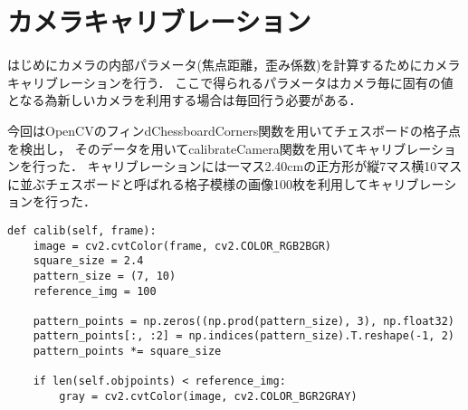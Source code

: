\section{カメラキャリブレーション}
\label{calib}

はじめにカメラの内部パラメータ(焦点距離，歪み係数)を計算するためにカメラキャリブレーションを行う．
ここで得られるパラメータはカメラ毎に固有の値となる為新しいカメラを利用する場合は毎回行う必要がある．

今回はOpenCVのフィンdChessboardCorners関数を用いてチェスボードの格子点を検出し，
そのデータを用いてcalibrateCamera関数を用いてキャリブレーションを行った．
キャリブレーションには一マス2.40cmの正方形が縦7マス横10マスに並ぶチェスボードと呼ばれる格子模様の画像100枚を利用してキャリブレーションを行った．

\begin{lstlisting}[caption=calibration code,label=calib_code]
def calib(self, frame):                                                                                                                                      
    image = cv2.cvtColor(frame, cv2.COLOR_RGB2BGR)                                                                                                           
    square_size = 2.4                                                                                                                                        
    pattern_size = (7, 10)                                                                                                                                   
    reference_img = 100                                                                                                                                      
                                                                                                                                                            
    pattern_points = np.zeros((np.prod(pattern_size), 3), np.float32)                                                                                        
    pattern_points[:, :2] = np.indices(pattern_size).T.reshape(-1, 2)                                                                                        
    pattern_points *= square_size                                                                                                                            
                                                                                                                                                            
    if len(self.objpoints) < reference_img:                                                                                                                  
        gray = cv2.cvtColor(image, cv2.COLOR_BGR2GRAY)                                                                                                       
                                                                                                                                                            

\end{lstlisting}
